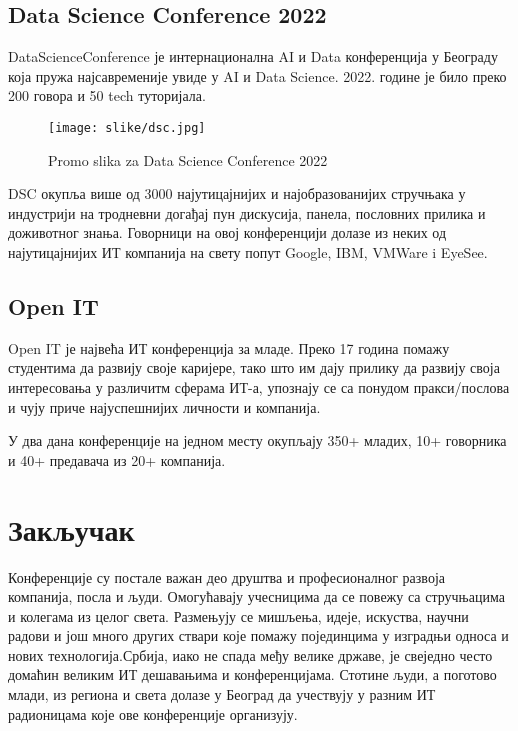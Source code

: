 \documentclass[12pt]{article}
\begin{document}
\subsection{Data Science Conference 2022}
DataScienceConference је интернационална AI и Data конференција у Београду која пружа најсавременије увиде у AI и Data Science. 2022. године је било преко 200 говора и 50 tech туторијала. 

\begin{figure}[h!]
        \centering\texttt{[image: slike/dsc.jpg]} 
        \caption{Promo slika za Data Science Conference 2022}
        \label{fig:dsc22}
\end{figure}

DSC окупља више од 3000 најутицајнијих и најобразованијих стручњака у индустрији на тродневни догађај пун дискусија, панела, пословних прилика и доживотног знања. Говорници на овој конференцији долазе из неких од најутицајнијих ИТ компанија на свету попут Google, IBM, VMWare i EyeSee.\cite{dsc}

\subsection{Open IT}
Open IT је највећа ИТ конференција за младе. Преко 17 година помажу студентима да развију своје каријере, тако што им дају прилику да развију своја интересовања у различитм сферама ИТ-а, упознају се са понудом пракси/послова и чују приче најуспешнијих личности и компанија.

У два дана конференције на једном месту окупљају 350+ младих, 10+ говорника и 40+ предавача из 20+ компанија.\cite{openit}

\section{Закључак}
Конференције су постале важан део друштва и професионалног развоја компанија, посла и људи. Омогућавају учесницима да се повежу са стручњацима и колегама из целог света. Размењују се мишљења, идеје, искуства, научни радови и још много других ствари које помажу појединцима у изградњи односа и нових технологија.Србија, иако не спада међу велике државе, је свеједно често домаћин великим ИТ дешавањима и конференцијама. Стотине људи, а поготово млади, из региона и света долазе у Београд да учествују у разним ИТ радионицама које ове конференције организују.

\pagebreak

\appendix
\end{document}
